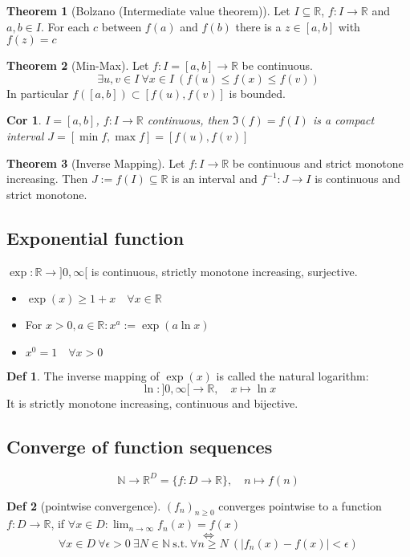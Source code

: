 \documentclass[a4paper, 10pt]{article}
\newtheorem*{corollary}{Cor}
\theoremstyle{definition}
\newtheorem*{definition}{Def}
\theoremstyle{named}
\newtheorem*{ntheorem_wrapper}{Theorem}
\newenvironment{ntheorem}%
    {\begin{mdframed}[style=important]\begin{ntheorem_wrapper}}%
    {\end{ntheorem_wrapper}\end{mdframed}}
\newcommand{\R}{\mathbb{R}}
\newcommand{\N}{\mathbb{N}}
\begin{document}
\begin{ntheorem}[Bolzano (Intermediate value theorem)]
    Let $I \subseteq \R$, $f : I \to \R$ and $a, b \in I$. For each $c$ between $f(a)$ and $f(b)$ there is a $z \in [a, b]$ with $f(z) = c$
\end{ntheorem}

\begin{ntheorem}[Min-Max]
    Let $f: I = [a, b] \to \R$ be continuous.
    $$\exists u, v \in I \ \forall x \in I \ (f(u) \leq f(x) \leq f(v))$$
    In particular $f([a, b]) \subset [f(u), f(v)]$ is bounded.
\end{ntheorem}

\begin{corollary}
    $I = [a, b]$, $f: I \to \R$ continuous, then $\Im(f) = f(I)$ is a compact interval $J = [\min f, \max f] = [f(u), f(v)]$
\end{corollary}

\begin{ntheorem}[Inverse Mapping]
    Let $f: I \to \R$ be continuous and strict monotone increasing. Then $J := f(I) \subseteq \R$ is an interval and $f^{-1}: J \to I$ is continuous and strict monotone.
\end{ntheorem}

\subsection{Exponential function}
$\exp: \R \to ]0, \infty [$ is continuous, strictly monotone increasing, surjective.
\begin{itemize}
    \item $\exp(x) \geq 1 + x \quad \forall x \in \R$
    \item For $x > 0, a \in \R: x^a := \exp(a \ln x)$
    \item $x^0 = 1 \quad \forall x > 0$
\end{itemize}

\begin{definition}
    The inverse mapping of $\exp (x)$ is called the natural logarithm: 
    $$\ln : ]0, \infty [ \to \R, \quad x \mapsto \ln x$$
    It is strictly monotone increasing, continuous and bijective.
\end{definition}

\subsection{Converge of function sequences}
$$\N \to \R^D = \{f: D \to \R\}, \quad n \mapsto f(n)$$
\begin{definition} [pointwise convergence]
    $(f_n)_{n \geq 0}$ converges pointwise to a function $f: D \to \R$, if $\forall x \in D : \lim_{n \to \infty} f_n(x) = f(x)$
    $$\iff$$
    $$\forall x \in D \ \forall \epsilon > 0 \ \exists N \in \N \ \text{s.t.} \ \forall n \geq N \ (|f_n(x) - f(x)| < \epsilon)$$
\end{definition}
\end{document}
